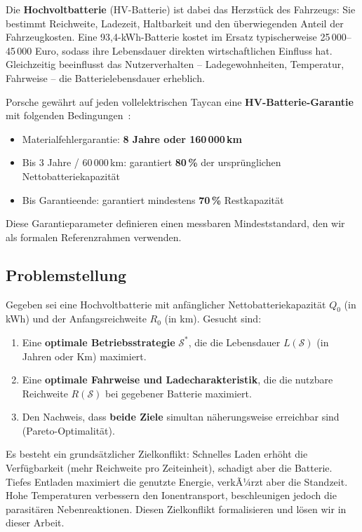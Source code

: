 ﻿\documentclass[a4paper,12pt]{article}
\theoremstyle{definition}
\begin{document}
Die \textbf{Hochvoltbatterie} (HV-Batterie) ist dabei das Herzst\"uck des
Fahrzeugs: Sie bestimmt Reichweite, Ladezeit, Haltbarkeit und den
\"uberwiegenden Anteil der Fahrzeugkosten. Eine 93,4-kWh-Batterie kostet
im Ersatz typischerweise 25\,000--45\,000 Euro, sodass ihre Lebensdauer
direkten wirtschaftlichen Einfluss hat. Gleichzeitig beeinflusst das
Nutzerverhalten -- Ladegewohnheiten, Temperatur, Fahrweise -- die
Batterielebensdauer erheblich.

Porsche gew\"ahrt auf jeden vollelektrischen Taycan eine
\textbf{HV-Batterie-Garantie} mit folgenden Bedingungen~\cite{Porsche2024}:
\begin{itemize}
  \item Materialfehlergarantie: \textbf{8 Jahre oder 160\,000\,km}
  \item Bis 3 Jahre / 60\,000\,km: garantiert \textbf{80\,\%} der urspr\"unglichen Nettobatteriekapazit\"at
  \item Bis Garantieende: garantiert mindestens \textbf{70\,\%} Restkapazit\"at
\end{itemize}
Diese Garantieparameter definieren einen messbaren Mindeststandard,
den wir als formalen Referenzrahmen verwenden.

\subsection{Problemstellung}

Gegeben sei eine Hochvoltbatterie mit anf\"anglicher Nettobatteriekapazit\"at
$Q_0$ (in kWh) und der Anfangsreichweite $R_0$ (in km). Gesucht sind:
\begin{enumerate}
  \item Eine \textbf{optimale Betriebsstrategie} $\mathcal{S}^*$, die die
    Lebensdauer $L(\mathcal{S})$ (in Jahren oder Km) maximiert.
  \item Eine \textbf{optimale Fahrweise und Ladecharakteristik},
    die die nutzbare Reichweite $R(\mathcal{S})$ bei gegebener Batterie maximiert.
  \item Den Nachweis, dass \textbf{beide Ziele} simultan n\"aherungsweise
    erreichbar sind (Pareto-Optimalit\"at).
\end{enumerate}

Es besteht ein grunds\"atzlicher Zielkonflikt: Schnelles Laden erh\"oht die
Verf\"ugbarkeit (mehr Reichweite pro Zeiteinheit), schadigt aber die Batterie.
Tiefes Entladen maximiert die genutzte Energie, verkÃ¼rzt aber die Standzeit.
Hohe Temperaturen verbessern den Ionentransport, beschleunigen jedoch die
parasit\"aren Nebenreaktionen. Diesen Zielkonflikt formalisieren und l\"osen
wir in dieser Arbeit.
\end{document}
